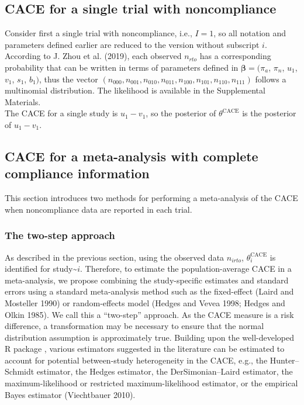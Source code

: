 \hypertarget{cace-for-a-single-trial-with-noncompliance}{%
\subsection{CACE for a single trial with noncompliance}\label{cace-for-a-single-trial-with-noncompliance}}

Consider first a single trial with noncompliance, i.e., \(I = 1\), so all notation and parameters defined earlier are reduced to the version without subscript \(i\). According to J. Zhou et al. (2019), each observed \(n_{rto}\) has a corresponding probability that can be written in terms of parameters defined in \(\boldsymbol{\beta}=(\pi_{a}\), \(\pi_{n}\), \(u_{1}\), \(v_{1}\), \(s_{1}\), \(b_{1})\), thus the vector \((n_{000}, n_{001}, n_{010}, n_{011}, n_{100}, n_{101}, n_{110}, n_{111})\) follows a multinomial distribution. The likelihood is available in the Supplemental Materials.\\
The CACE for a single study is \(u_{1}-v_{1}\), so the posterior of \(\theta^\text{CACE}\) is the posterior of \(u_{1}-v_{1}\).

\hypertarget{cace-for-a-meta-analysis-with-complete-compliance-information}{%
\subsection{CACE for a meta-analysis with complete compliance information}\label{cace-for-a-meta-analysis-with-complete-compliance-information}}

This section introduces two methods for performing a meta-analysis of the CACE when noncompliance data are reported in each trial.

\hypertarget{the-two-step-approach}{%
\subsubsection{The two-step approach}\label{the-two-step-approach}}

As described in the previous section, using the observed data \(n_{irto}\), \(\theta^\text{CACE}_i\) is identified for study\textasciitilde{}\(i\). Therefore, to estimate the population-average CACE in a meta-analysis, we propose combining the study-specific estimates and standard errors using a standard meta-analysis method such as the fixed-effect (Laird and Mosteller 1990) or random-effects model (Hedges and Vevea 1998; Hedges and Olkin 1985). We call this a ``two-step'' approach. As the CACE measure is a risk difference, a transformation may be necessary to ensure that the normal distribution assumption is approximately true.
Building upon the well-developed R package , various estimators suggested in the literature can be estimated to account for potential between-study heterogeneity in the CACE, e.g., the Hunter--Schmidt estimator, the Hedges estimator, the DerSimonian--Laird estimator, the maximum-likelihood or restricted maximum-likelihood estimator, or the empirical Bayes estimator (Viechtbauer 2010).

